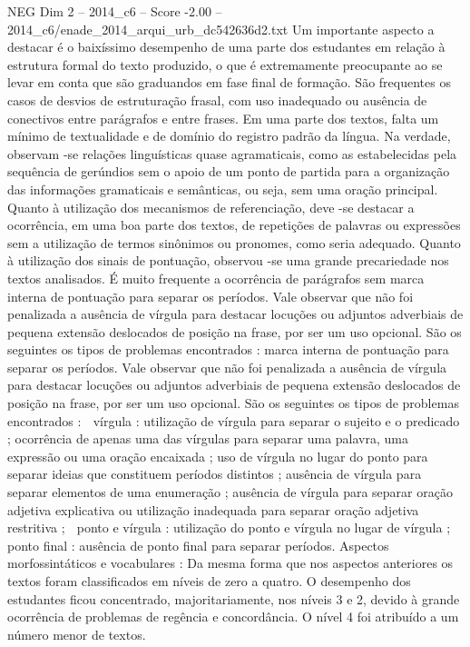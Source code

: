 \begin{textsample}{NEG Dim 2 – 2014\_c6 – Score -2.00 – 2014\_c6/enade\_2014\_arqui\_urb\_dc542636d2.txt}
Um importante aspecto a destacar é o baixíssimo desempenho de uma parte dos estudantes em relação à estrutura formal do texto produzido, o que é extremamente preocupante ao se levar em conta que são graduandos em fase final de formação.
São frequentes os casos de desvios de estruturação frasal, com uso inadequado ou ausência de conectivos entre parágrafos e entre frases.
Em uma parte dos textos, falta um mínimo de textualidade e de domínio do registro padrão da língua.
Na verdade, observam -se relações linguísticas quase agramaticais, como as estabelecidas pela sequência de gerúndios sem o apoio de um ponto de partida para a organização das informações gramaticais e semânticas, ou seja, sem uma oração principal.
Quanto à utilização dos mecanismos de referenciação, deve -se destacar a ocorrência, em uma boa parte dos textos, de repetições de palavras ou expressões sem a utilização de termos sinônimos ou pronomes, como seria adequado.
Quanto à utilização dos sinais de pontuação, observou -se uma grande precariedade nos textos analisados.
É muito frequente a ocorrência de parágrafos sem marca interna de pontuação para separar os períodos.
Vale observar que não foi penalizada a ausência de vírgula para destacar locuções ou adjuntos adverbiais de pequena extensão deslocados de posição na frase, por ser um uso opcional.
São os seguintes os tipos de problemas encontrados : marca interna de pontuação para separar os períodos.
Vale observar que não foi penalizada a ausência de vírgula para destacar locuções ou adjuntos adverbiais de pequena extensão deslocados de posição na frase, por ser um uso opcional.
São os seguintes os tipos de problemas encontrados :  vírgula : utilização de vírgula para separar o sujeito e o predicado ; ocorrência de apenas uma das vírgulas para separar uma palavra, uma expressão ou uma oração encaixada ; uso de vírgula no lugar do ponto para separar ideias que constituem períodos distintos ; ausência de vírgula para separar elementos de uma enumeração ; ausência de vírgula para separar oração adjetiva explicativa ou utilização inadequada para separar oração adjetiva restritiva ;  ponto e vírgula : utilização do ponto e vírgula no lugar de vírgula ;  ponto final : ausência de ponto final para separar períodos.
Aspectos morfossintáticos e vocabulares : Da mesma forma que nos aspectos anteriores os textos foram classificados em níveis de zero a quatro.
O desempenho dos estudantes ficou concentrado, majoritariamente, nos níveis 3 e 2, devido à grande ocorrência de problemas de regência e concordância.
O nível 4 foi atribuído a um número menor de textos.

\end{textsample}
